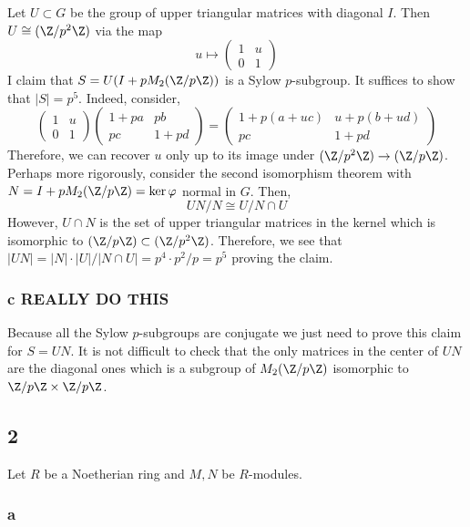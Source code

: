 \documentclass[12pt]{article}
\begin{document}
Let $U \subset G$ be the group of upper triangular matrices with diagonal $I$. Then $U \cong (\Z / p^2 \Z)$ via the map
\[ u \mapsto \begin{pmatrix}
1 & u
\\
0  & 1
\end{pmatrix} \]
I claim that $S = U (I + p M_2(\Z/p \Z))$ is a Sylow $p$-subgroup. It suffices to show that $|S| = p^5$. Indeed, consider,
\[ \begin{pmatrix}
1 & u
\\
0  & 1
\end{pmatrix} 
\begin{pmatrix}
1 + p a & p b
\\
p c & 1 + p d
\end{pmatrix}
= 
\begin{pmatrix}
1 + p (a + u c) & u + p (b + ud)
\\
pc & 1 + pd 
\end{pmatrix} \]
Therefore, we can recover $u$ only up to its image under $(\Z / p^2 \Z) \to (\Z / p \Z)$. Perhaps more rigorously, consider the second isomorphism theorem with $N = I + p M_2 (\Z / p \Z) = \ker{\varphi}$ normal in $G$. Then,
\[ U N / N \cong U / N \cap U \]
However, $U \cap N$ is the set of upper triangular matrices in the kernel which is isomorphic to $(\Z / p \Z) \subset (\Z / p^2 \Z)$. Therefore, we see that $|UN| = |N| \cdot |U| / |N \cap U| = p^4 \cdot p^2 / p = p^5$ proving the claim.

\subsubsection{c REALLY DO THIS}

Because all the Sylow $p$-subgroups are conjugate we just need to prove this claim for $S = UN$. It is not difficult to check that the only matrices in the center of $UN$ are the diagonal ones which is a subgroup of $M_2(\Z / p \Z)$ isomorphic to $\Z / p \Z \times \Z / p \Z$.

\subsection{2}

Let $R$ be a Noetherian ring and $M, N$ be $R$-modules.

\subsubsection{a}
\end{document}
